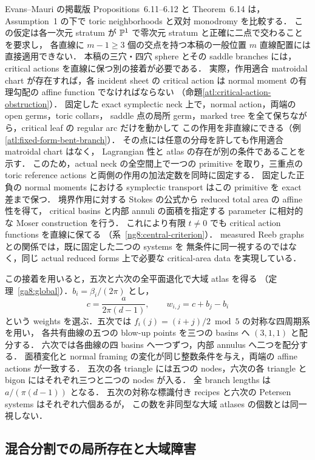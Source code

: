 Evans--Mauri の掲載版 Propositions~6.11--6.12 と Theorem~6.14 は，
Assumption~1 の下で toric neighborhoods と双対 monodromy を比較する\cite{EM}．
この仮定は各一次元 stratum が $\mathbb P^1$ で零次元 stratum と正確に二点で交わることを要求し，
各直線に $m-1\ge3$ 個の交点を持つ本稿の一般位置 $m$ 直線配置には直接適用できない．
本稿の三穴・四穴 sphere とその saddle branches には，critical actions を直線に保つ別の接着が必要である．
実際，作用適合 matroidal chart が存在すれば，各 incident sheet の critical action は
normal moment の有理勾配の affine function でなければならない
（命題\ref{atl:critical-action-obstruction}）．
固定した exact symplectic neck 上で，normal action，両端の open germs，toric collars，
saddle 点の局所 germ，marked tree を全て保ちながら，critical leaf の regular arc だけを動かして
この作用を非直線にできる（例\ref{atl:fixed-form-bent-branch}）．
その点には任意の分母を許しても作用適合 matroidal chart はなく，
Lagrangian 性と atlas の存在が別の条件であることを示す．
このため，actual neck の全空間上で一つの primitive を取り，三重点の toric reference actions
と両側の作用の加法定数を同時に固定する．
固定した正負の normal moments における symplectic transport はこの primitive を exact 差まで保つ．
境界作用に対する Stokes の公式から reduced total area の affine 性を得て，
critical basins と内部 annuli の面積を指定する parameter に相対的な Moser construction を行う．
これにより有限 $t\ne0$ でも critical action functions を直線に保てる
（系~\ref{ng8:central-criterion}）．
measured Reeb graphs\cite{DMT,IKM}との関係では，既に固定した二つの systems を
無条件に同一視するのではなく，同じ actual reduced forms 上で必要な critical-area data を実現している．

この接着を用いると，五次と六次の全平面退化で大域 atlas を得る
（定理~\ref{ga8:global}）．$b_i=\beta_i/(2\pi)$ とし，
\[
 c=\frac{a}{2\pi(d-1)},\qquad w_{i,j}=c+b_j-b_i
\]
という weights を選ぶ．五次では $f_i(j)=(i+j)/2\bmod5$ の対称な四周期系を用い，
各共有曲線の五つの blow-up points を三つの basins へ $(3,1,1)$ と配分する．
六次では各曲線の四 basins へ一つずつ，内部 annulus へ二つを配分する．
面積変化と normal framing の変化が同じ整数条件を与え，両端の affine actions が一致する．
五次の各 triangle には五つの nodes，六次の各 triangle と bigon にはそれぞれ三つと二つの nodes が入る．
全 branch lengths は $a/(\pi(d-1))$ となる．
五次の対称な標識付き recipes と六次の Petersen systems はそれぞれ六個あるが，
この数を非同型な大域 atlases の個数とは同一視しない．

\subsection{混合分割での局所存在と大域障害}

